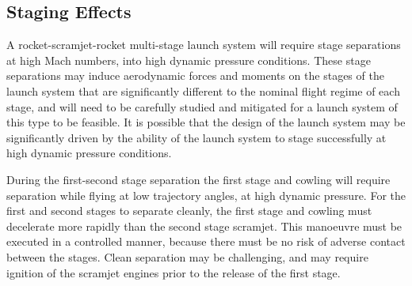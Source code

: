 	


\subsection{Staging Effects}\label{sec:stagingSimp}

A rocket-scramjet-rocket multi-stage launch system will require stage separations at high Mach numbers, into high dynamic pressure conditions. These stage separations may induce aerodynamic forces and moments on the stages of the launch system that are significantly different to the nominal flight regime of each stage, and will need to be carefully studied and mitigated for a launch system of this type to be feasible. It is possible that the design of the launch system may be significantly driven by the ability of the launch system to stage successfully at high dynamic pressure conditions. 

During the first-second stage separation the first stage and cowling will require separation while flying at low trajectory angles, at high dynamic pressure. For the first and second stages to separate cleanly, the first stage and cowling must decelerate more rapidly than the second stage scramjet. This manoeuvre must be executed in a controlled manner, because there must be no risk of adverse contact between the stages. Clean separation may be challenging, and may require ignition of the scramjet engines prior to the release of the first stage. 

